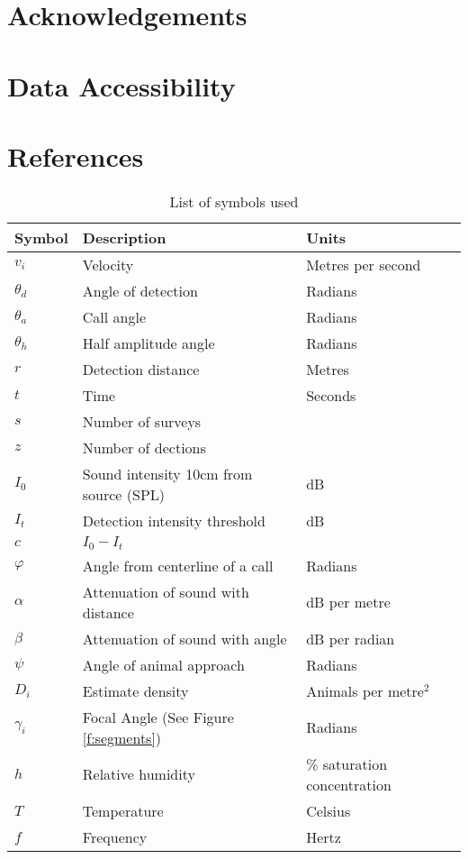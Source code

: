 \documentclass[a4paper,10pt,reqno,oneside]{amsart}
\begin{document}
\section{Acknowledgements}

\section{Data Accessibility}

\section{References}





\begin{table}[t]
\centering
\begin{tabular}{lll}
Symbol 	& Description & Units\\\hline
$v_i$		& Velocity & Metres per second\\
$\theta_d$	& Angle of detection & Radians \\
$\theta_a$	&Call angle			& Radians \\
$\theta_h$	& Half amplitude angle & Radians\\
$r$ 		& Detection distance & Metres\\
$t$			& Time & Seconds\\
$s$			& Number of surveys&\\
$z$			& Number of dections & \\
$I_0$		& Sound intensity 10cm from source (SPL) & dB\\
$I_t$		& Detection intensity threshold &  dB\\
$c$			& $I_0-I_t$ &\\
$\varphi$ 	& Angle from centerline of a call & Radians\\
$\alpha$	& Attenuation of sound with distance & dB per metre\\
$\beta$		& Attenuation of sound with angle & dB per radian\\
$\psi$		& Angle of animal approach & Radians\\
$D_i$		& Estimate density & Animals per metre$^2$ \\
$\gamma_i$	& Focal Angle (See Figure \ref{f:segments})		& Radians\\
$h$			& Relative humidity	& \% saturation concentration\\
$T$			& Temperature & Celsius\\
$f$			& Frequency & Hertz\\
\end{tabular}
\caption{List of symbols used}
\label{t:paras}
\end{table}



	
	
\end{document}
